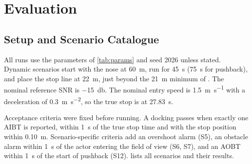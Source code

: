 \documentclass[conference]{IEEEtran}
\begin{document}
\section{Evaluation}
\label{sec:evaluation}

\subsection{Setup and Scenario Catalogue}
All runs use the parameters of \cref{tab:params} and seed 2026 unless stated. Dynamic scenarios start with the nose at \SI{60}{\metre}, run for \SI{45}{\second} (\SI{75}{\second} for pushback), and place the stop line at \SI{22}{\metre}, just beyond the \SI{21}{\metre} minimum of \cite{khalil2020radar}. The nominal reference SNR is \SI{-15}{\decibel}. The nominal entry speed is \SI{1.5}{\metre\per\second} with a deceleration of \SI{0.3}{\metre\per\second\squared}, so the true stop is at \SI{27.83}{\second}.

Acceptance criteria were fixed before running. A docking passes when exactly one AIBT is reported, within \SI{1}{\second} of the true stop time and with the stop position within \SI{0.10}{\metre}. Scenario-specific criteria add an overshoot alarm (S5), an obstacle alarm within \SI{1}{\second} of the actor entering the field of view (S6, S7), and an AOBT within \SI{1}{\second} of the start of pushback (S12).  lists all scenarios and their results.
\end{document}
